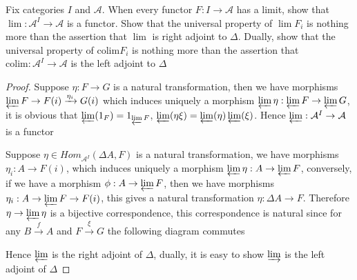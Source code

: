 \documentclass{article}
\newenvironment{exercise}[2][Exercise]{\begin{trivlist}
\item[\hskip \labelsep {\bfseries #1}\hskip \labelsep {\bfseries #2.}]}{\end{trivlist}}
\theoremstyle{definition}
\theoremstyle{remark}
\theoremstyle{definition}
\begin{document}
\begin{exercise}{\textbf{A6.1}}
Fix categories $I$ and $\mathcal A$. When every functor $F:I\to\mathcal A$ has a limit, show that $\lim:\mathcal A^I\to\mathcal A$ is a functor. Show that the universal property of $\lim F_i$ is nothing more than the assertion that $\lim$ is right adjoint to $\Delta$. Dually, show that the universal property of $\mathrm{colim}F_i$ is nothing more than the assertion that $\mathrm{colim}:\mathcal A^I\to\mathcal A$ is the left adjoint to $\Delta$
\end{exercise}

\begin{proof}
Suppose $\eta:F\to G$ is a natural transformation, then we have morphisms $\displaystyle\varprojlim F\to F(i)\xrightarrow{\eta_i}G(i)$ which induces uniquely a morphism $\displaystyle\varprojlim\eta:\varprojlim F\to\varprojlim G$, it is obvious that $\varprojlim(1_F)=1_{\varprojlim F}$, $\varprojlim(\eta\xi)=\varprojlim(\eta)\varprojlim(\xi)$. Hence $\varprojlim:\mathcal A^I\to\mathcal A$ is a functor \par
Suppose $\eta\in Hom_{\mathcal A^I}(\Delta A,F)$ is a natural transformation, we have morphisms $\eta_i:A\to F(i)$, which induces uniquely a morphism $\displaystyle\varprojlim\eta:A\to\varprojlim F$, conversely, if we have a morphism $\phi:A\to\varprojlim F$, then we have morphisms $\eta_i:A\to\varprojlim F\to F(i)$, this gives a natural transformation $\eta:\Delta A\to F$. Therefore $\eta\to\varprojlim\eta$ is a bijective correspondence, this correspondence is natural since for any $B\xrightarrow{f} A$ and $F\xrightarrow{\xi} G$ the following diagram commutes
\begin{center}
\end{center}
Hence $\varprojlim$ is the right adjoint of $\Delta$, dually, it is easy to show $\varinjlim$ is the left adjoint of $\Delta$
\end{proof}
\end{document}
